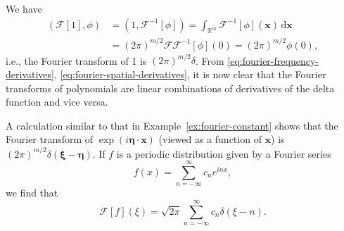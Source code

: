 \begin{Example}
\label{ex:fourier-constant}
We have
\begin{equation}\label{eq:fourier-transform-constant-pairing}
\begin{aligned}
(\mathcal{F}[1],\phi)&=(1,\mathcal{F}^{-1}[\phi])=\int_{\mathbb{R}^m}\mathcal{F}^{-1}[\phi](\bm{x})\,\mathrm{d}\bm{x}\\
&=(2\pi)^{m/2}\mathcal{F}\mathcal{F}^{-1}[\phi](0)=(2\pi)^{m/2}\phi(0),
\end{aligned}
\end{equation}
i.e., the Fourier transform of 1 is $(2\pi)^{m/2}\delta$. From \eqref{eq:fourier-frequency-derivatives}, \eqref{eq:fourier-spatial-derivatives}, it is now clear that the Fourier transforms of polynomials are linear combinations of derivatives of the delta function and vice versa.
\end{Example}

\begin{Example}
\label{ex:fourier-exponential-periodic}
A calculation similar to that in Example~\ref{ex:fourier-constant} shows that the Fourier transform of $\exp(i\bm{\eta}\cdot\bm{x})$ (viewed as a function of $\bm{x}$) is $(2\pi)^{m/2}\delta(\bm{\xi}-\bm{\eta})$. If $f$ is a periodic distribution given by a Fourier series
\begin{equation}\label{eq:periodic-distribution-fourier-series}
f(x)=\sum_{n=-\infty}^{\infty}c_ne^{inx},
\end{equation}
we find that
\begin{equation}\label{eq:periodic-distribution-fourier-point-masses}
\mathcal{F}[f](\xi)=\sqrt{2\pi}\sum_{n=-\infty}^{\infty}c_n\delta(\xi-n).
\end{equation}

\end{Example}

